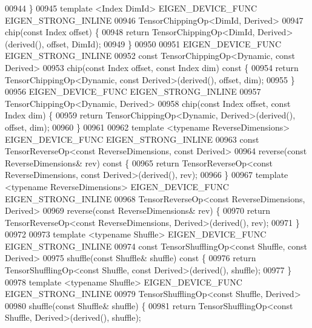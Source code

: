 \begin{DoxyCode}
00944     \}
00945     \textcolor{keyword}{template} <Index DimId> EIGEN\_DEVICE\_FUNC EIGEN\_STRONG\_INLINE
00946     TensorChippingOp<DimId, Derived>
00947     chip(\textcolor{keyword}{const} Index offset) \{
00948       \textcolor{keywordflow}{return} TensorChippingOp<DimId, Derived>(derived(), offset, DimId);
00949     \}
00950 
00951     EIGEN\_DEVICE\_FUNC EIGEN\_STRONG\_INLINE
00952     \textcolor{keyword}{const} TensorChippingOp<Dynamic, const Derived>
00953     chip(\textcolor{keyword}{const} Index offset, \textcolor{keyword}{const} Index dim)\textcolor{keyword}{ const }\{
00954       \textcolor{keywordflow}{return} TensorChippingOp<Dynamic, const Derived>(derived(), offset, dim);
00955     \}
00956     EIGEN\_DEVICE\_FUNC EIGEN\_STRONG\_INLINE
00957     TensorChippingOp<Dynamic, Derived>
00958     chip(\textcolor{keyword}{const} Index offset, \textcolor{keyword}{const} Index dim) \{
00959       \textcolor{keywordflow}{return} TensorChippingOp<Dynamic, Derived>(derived(), offset, dim);
00960     \}
00961 
00962     \textcolor{keyword}{template} <\textcolor{keyword}{typename} ReverseDimensions> EIGEN\_DEVICE\_FUNC EIGEN\_STRONG\_INLINE
00963     \textcolor{keyword}{const} TensorReverseOp<const ReverseDimensions, const Derived>
00964     reverse(\textcolor{keyword}{const} ReverseDimensions& rev)\textcolor{keyword}{ const }\{
00965       \textcolor{keywordflow}{return} TensorReverseOp<const ReverseDimensions, const Derived>(derived(), rev);
00966     \}
00967     \textcolor{keyword}{template} <\textcolor{keyword}{typename} ReverseDimensions> EIGEN\_DEVICE\_FUNC EIGEN\_STRONG\_INLINE
00968     TensorReverseOp<const ReverseDimensions, Derived>
00969     reverse(\textcolor{keyword}{const} ReverseDimensions& rev) \{
00970       \textcolor{keywordflow}{return} TensorReverseOp<const ReverseDimensions, Derived>(derived(), rev);
00971     \}
00972 
00973     \textcolor{keyword}{template} <\textcolor{keyword}{typename} Shuffle> EIGEN\_DEVICE\_FUNC EIGEN\_STRONG\_INLINE
00974     \textcolor{keyword}{const} TensorShufflingOp<const Shuffle, const Derived>
00975     shuffle(\textcolor{keyword}{const} Shuffle& shuffle)\textcolor{keyword}{ const }\{
00976       \textcolor{keywordflow}{return} TensorShufflingOp<const Shuffle, const Derived>(derived(), shuffle);
00977     \}
00978     \textcolor{keyword}{template} <\textcolor{keyword}{typename} Shuffle> EIGEN\_DEVICE\_FUNC EIGEN\_STRONG\_INLINE
00979     TensorShufflingOp<const Shuffle, Derived>
00980     shuffle(\textcolor{keyword}{const} Shuffle& shuffle) \{
00981       \textcolor{keywordflow}{return} TensorShufflingOp<const Shuffle, Derived>(derived(), shuffle);

\end{DoxyCode}
